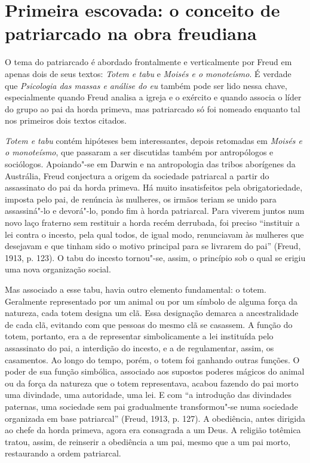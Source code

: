 \section{Primeira escovada: o conceito de patriarcado na obra freudiana}

O tema do patriarcado é abordado frontalmente e verticalmente por Freud
em apenas dois de seus textos: \emph{Totem e tabu} e \emph{Moisés e o
monoteísmo}. É verdade que \emph{Psicologia das massas e análise do eu}
também pode ser lido nessa chave, especialmente quando Freud analisa a
igreja e o exército e quando associa o líder do grupo ao pai da horda
primeva, mas patriarcado só foi nomeado enquanto tal nos primeiros dois
textos citados.

\emph{Totem e tabu} contém hipóteses bem interessantes, depois retomadas
em \emph{Moisés e o monoteísmo}, que passaram a ser discutidas também
por antropólogos e sociólogos. Apoiando"-se em Darwin e na antropologia
das tribos aborígenes da Austrália, Freud conjectura a origem da
sociedade patriarcal a partir do assassinato do pai da horda primeva. Há
muito insatisfeitos pela obrigatoriedade, imposta pelo pai, de renúncia
às mulheres, os irmãos teriam se unido para assassiná"-lo e devorá"-lo,
pondo fim à horda patriarcal. Para viverem juntos num novo laço fraterno
sem restituir a horda recém derrubada, foi preciso ``instituir a lei
contra o incesto, pela qual todos, de igual modo, renunciavam às
mulheres que desejavam e que tinham sido o motivo principal para se
livrarem do pai'' (Freud, 1913, p. 123). O tabu do incesto tornou"-se,
assim, o princípio sob o qual se erigiu uma nova organização social.

Mas associado a esse tabu, havia outro elemento fundamental: o totem.
Geralmente representado por um animal ou por um símbolo de alguma força
da natureza, cada totem designa um clã. Essa designação demarca a
ancestralidade de cada clã, evitando com que pessoas do mesmo clã se
casassem. A função do totem, portanto, era a de representar
simbolicamente a lei instituída pelo assassinato do pai, a interdição do
incesto, e a de regulamentar, assim, os casamentos. Ao longo do tempo,
porém, o totem foi ganhando outras funções. O poder de sua função
simbólica, associado aos supostos poderes mágicos do animal ou da força
da natureza que o totem representava, acabou fazendo do pai morto uma
divindade, uma autoridade, uma lei. E com ``a introdução das divindades
paternas, uma sociedade sem pai gradualmente transformou"-se numa
sociedade organizada em base patriarcal'' (Freud, 1913, p. 127). A
obediência, antes dirigida ao chefe da horda primeva, agora era
consagrada a um Deus. A religião totêmica tratou, assim, de reinserir a
obediência a um pai, mesmo que a um pai morto, restaurando a ordem
patriarcal.

